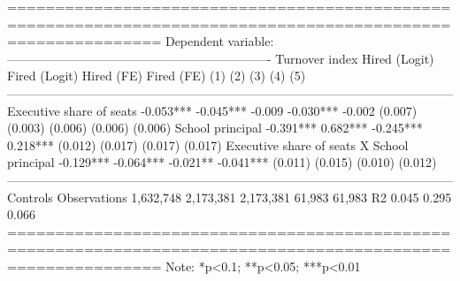 
============================================================================================================
                                                                  Dependent variable:                       
                                            ----------------------------------------------------------------
                                            Turnover index Hired (Logit) Fired (Logit) Hired (FE) Fired (FE)
                                                 (1)            (2)           (3)         (4)        (5)    
------------------------------------------------------------------------------------------------------------
Executive share of seats                      -0.053***      -0.045***      -0.009     -0.030***    -0.002  
                                               (0.007)        (0.003)       (0.006)     (0.006)    (0.006)  
School principal                                             -0.391***     0.682***    -0.245***   0.218*** 
                                                              (0.012)       (0.017)     (0.017)    (0.017)  
Executive share of seats X School principal                  -0.129***     -0.064***    -0.021**  -0.041*** 
                                                              (0.011)       (0.015)     (0.010)    (0.012)  
------------------------------------------------------------------------------------------------------------
Controls                                                                                                    
Observations                                  1,632,748      2,173,381     2,173,381     61,983     61,983  
R2                                              0.045                                    0.295      0.066   
============================================================================================================
Note:                                                                            *p<0.1; **p<0.05; ***p<0.01
